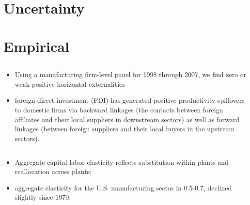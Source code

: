 \documentclass[10pt]{article} %
\begin{document}
    \subsection{\cite{KletteKortum2004}}

    \subsection{\cite{Melitz2003}}
\section{Uncertainty}
    \subsection{\cite{ArellanoBaiKehoe2019}}
\section{Empirical}

    \subsection{\cite{DuHarrisonJefferson2012}}
    \begin{itemize}
        \item Using a manufacturing firm-level panel for 1998 through 2007, we find zero or weak positive horizontal externalities
        \item foreign direct investment (FDI) has generated positive productivity spillovers to domestic firms via backward linkages (the contacts between foreign affiliates and their local suppliers in downstream sectors) as well as forward linkages (between foreign suppliers and their local buyers in the upstream sectors).
    \end{itemize}

    \subsection{\cite{OberfieldRaval2021}}
    \begin{itemize}
        \item Aggregate capital-labor elasticity reflects substitution within plants and reallocation across plants;
        \item aggregate elasticity for the U.S. manufacturing sector in 0.5-0.7, declined slightly since 1970.
    \end{itemize}
\end{document}

